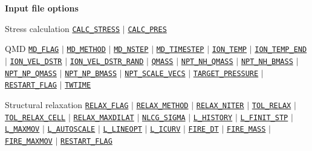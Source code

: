 \begin{frame}[allowframebreaks]{\textbf{Input file options}}
  \vspace{-2mm}
  \begin{block}{Stress calculation}
  \hyperlink{CALC_STRESS}{\texttt{CALC\_STRESS}} $\vert$
  \hyperlink{CALC_PRES}{\texttt{CALC\_PRES}}
  \end{block}
  \vspace{-2mm}
  
  \begin{block}{QMD}
  \hyperlink{MD_FLAG}{\texttt{MD\_FLAG}} $\vert$
  \hyperlink{MD_METHOD}{\texttt{MD\_METHOD}} $\vert$
  \hyperlink{MD_NSTEP}{\texttt{MD\_NSTEP}} $\vert$
  \hyperlink{MD_TIMESTEP}{\texttt{MD\_TIMESTEP}} $\vert$
  \hyperlink{ION_TEMP}{\texttt{ION\_TEMP}} $\vert$
  \hyperlink{ION_TEMP_END}{\texttt{ION\_TEMP\_END}} $\vert$
  \hyperlink{ION_VEL_DSTR}{\texttt{ION\_VEL\_DSTR}} $\vert$
  \hyperlink{ION_VEL_DSTR_RAND}{\texttt{ION\_VEL\_DSTR\_RAND}} $\vert$
  \hyperlink{QMASS}{\texttt{QMASS}} $\vert$
  \hyperlink{NPT_NH_QMASS}{\texttt{NPT\_NH\_QMASS}} $\vert$
  \hyperlink{NPT_NH_BMASS}{\texttt{NPT\_NH\_BMASS}} $\vert$
  \hyperlink{NPT_NP_QMASS}{\texttt{NPT\_NP\_QMASS}} $\vert$
  \hyperlink{NPT_NP_BMASS}{\texttt{NPT\_NP\_BMASS}} $\vert$
  \hyperlink{NPT_SCALE_VECS}{\texttt{NPT\_SCALE\_VECS}} $\vert$
  \hyperlink{TARGET_PRESSURE}{\texttt{TARGET\_PRESSURE}} $\vert$
  \hyperlink{RESTART_FLAG}{\texttt{RESTART\_FLAG}} $\vert$
  \hyperlink{TWTIME}{\texttt{TWTIME}}
  \end{block}
  
  \vspace{-2mm}
  \begin{block}{Structural relaxation}
  \hyperlink{RELAX_FLAG}{\texttt{RELAX\_FLAG}} $\vert$
  \hyperlink{RELAX_METHOD}{\texttt{RELAX\_METHOD}} $\vert$
  \hyperlink{RELAX_NITER}{\texttt{RELAX\_NITER}} $\vert$
  \hyperlink{TOL_RELAX}{\texttt{TOL\_RELAX}} $\vert$
  \hyperlink{TOL_RELAX_CELL}{\texttt{TOL\_RELAX\_CELL}} $\vert$
  \hyperlink{RELAX_MAXDILAT}{\texttt{RELAX\_MAXDILAT}} $\vert$
  \hyperlink{NLCG_SIGMA}{\texttt{NLCG\_SIGMA}} $\vert$
  \hyperlink{L_HISTORY}{\texttt{L\_HISTORY}} $\vert$
  \hyperlink{L_FINIT_STP}{\texttt{L\_FINIT\_STP}} $\vert$
  \hyperlink{L_MAXMOV}{\texttt{L\_MAXMOV}} $\vert$
  \hyperlink{L_AUTOSCALE}{\texttt{L\_AUTOSCALE}} $\vert$
  \hyperlink{L_LINEOPT}{\texttt{L\_LINEOPT}} $\vert$
  \hyperlink{L_ICURV}{\texttt{L\_ICURV}} $\vert$
  \hyperlink{FIRE_DT}{\texttt{FIRE\_DT}} $\vert$
  \hyperlink{FIRE_MASS}{\texttt{FIRE\_MASS}} $\vert$
  \hyperlink{FIRE_MAXMOV}{\texttt{FIRE\_MAXMOV}} $\vert$
  \hyperlink{RESTART_FLAG}{\texttt{RESTART\_FLAG}}
  \end{block}
  

\end{frame}

